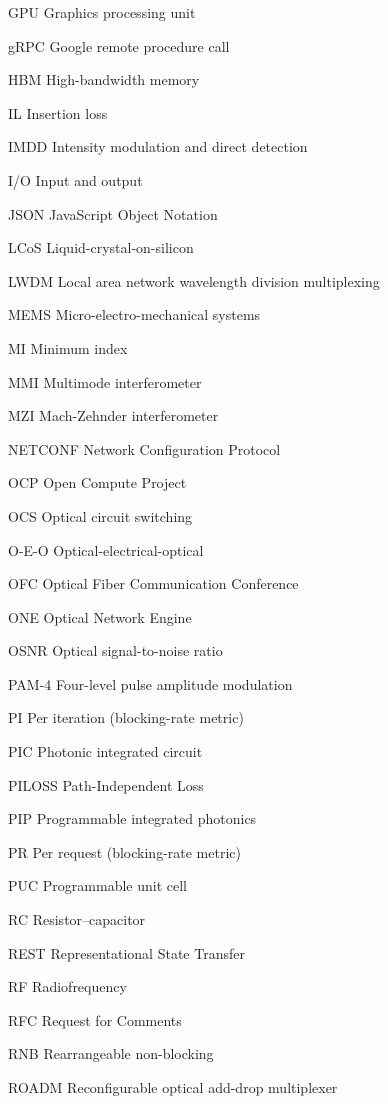 \begin{list}{}
	\item[GPU] Graphics processing unit
	\item[gRPC] Google remote procedure call
	\item[HBM] High-bandwidth memory
	\item[IL] Insertion loss
	\item[IMDD] Intensity modulation and direct detection
	\item[I/O] Input and output
	\item[JSON] JavaScript Object Notation
	\item[LCoS] Liquid-crystal-on-silicon
	\item[LWDM] Local area network wavelength division multiplexing
	\item[MEMS] Micro-electro-mechanical systems
	\item[MI] Minimum index
	\item[MMI] Multimode interferometer
	\item[MZI] Mach-Zehnder interferometer
	\item[NETCONF] Network Configuration Protocol
	\item[OCP] Open Compute Project
	\item[OCS] Optical circuit switching
	\item[O-E-O] Optical-electrical-optical
	\item[OFC] Optical Fiber Communication Conference
	\item[ONE] Optical Network Engine
	\item[OSNR] Optical signal-to-noise ratio
	\item[PAM-4] Four-level pulse amplitude modulation
	\item[PI] Per iteration (blocking-rate metric)
	\item[PIC] Photonic integrated circuit
	\item[PILOSS] Path-Independent Loss
	\item[PIP] Programmable integrated photonics
	\item[PR] Per request (blocking-rate metric)
	\item[PUC] Programmable unit cell
	\item[RC] Resistor--capacitor
	\item[REST] Representational State Transfer
	\item[RF] Radiofrequency
	\item[RFC] Request for Comments
	\item[RNB] Rearrangeable non-blocking
	\item[ROADM] Reconfigurable optical add-drop multiplexer

\end{list}
